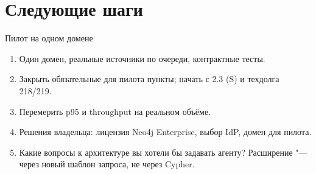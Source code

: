 \section{Следующие шаги}

\begin{frame}{Пилот на одном домене}
  \begin{enumerate}
    \item Один домен, реальные источники по очереди, контрактные тесты.
    \item Закрыть обязательные для пилота пункты; начать с 2.3 (S) и техдолга 218/219.
    \item Перемерить p95 и throughput на реальном объёме.
    \item Решения владельца: лицензия Neo4j Enterprise, выбор IdP, домен для пилота.
    \item Какие вопросы к архитектуре вы хотели бы задавать агенту? Расширение "--- через новый шаблон запроса, не через Cypher.
  \end{enumerate}
\end{frame}
